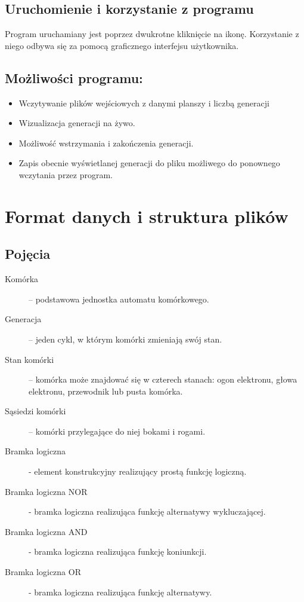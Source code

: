 \documentclass[a4paper,11pt, notitlepage ]{article}
\begin{document}
\subsection{Uruchomienie i korzystanie z programu}
Program uruchamiany jest poprzez dwukrotne kliknięcie na ikonę. Korzystanie z niego odbywa się za pomocą graficznego interfejsu użytkownika.

\subsection{Możliwości programu:}
\begin{itemize}
\item Wczytywanie plików wejściowych z danymi planszy i liczbą generacji
\item Wizualizacja generacji na żywo.
\item Możliwość wstrzymania i zakończenia generacji.
\item Zapis obecnie wyświetlanej generacji do pliku możliwego do ponownego wczytania przez program.
\end{itemize}

\section{Format danych i struktura plików}
\subsection{Pojęcia}
\begin{description}
\item[Komórka] – podstawowa jednostka automatu komórkowego.
\item[Generacja] – jeden cykl, w którym komórki zmieniają swój stan.
\item[Stan komórki] – komórka może znajdować się w czterech stanach: ogon elektronu, głowa elektronu, przewodnik lub pusta komórka.
\item[Sąsiedzi komórki] – komórki przylegające do niej bokami i rogami.
\item[Bramka logiczna] - element konstrukcyjny realizujący prostą funkcję logiczną.
\item[Bramka logiczna NOR] - bramka logiczna realizująca funkcję alternatywy wykluczającej.
\item[Bramka logiczna AND] - bramka logiczna realizująca funkcję koniunkcji.
\item[Bramka logiczna OR] - bramka logiczna realizująca funkcję alternatywy.

\end{description}
\end{document}
